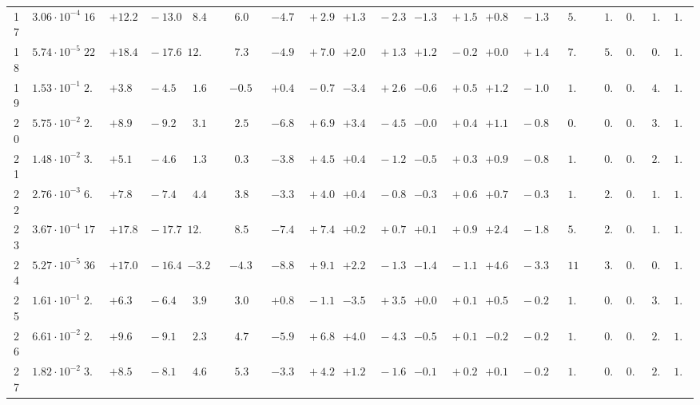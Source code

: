 \documentclass[12pt]{article}
\begin{document}
\begin{table}
\begin{tabular}{ccrr@{\hskip0pt}rrc@{\hskip0pt}r@{\hskip0pt}c@{\hskip0pt}r@{\hskip0pt}rr@{\hskip0pt}rr@{\hskip0pt}rr@{\hskip0pt}rr@{\hskip0pt}r@{\hskip0pt}r@{\hskip0pt}c|rr|r}
17 &$3.06 \cdot 10^{-4}$ &$16.0$  & ${+12.2~}$&${~-13.0}$ & $ 8.4$  & &$ 6.0$&&${-4.7~}$&${~+2.9}$ & ${+1.3~}$&${~-2.3}$ & ${-1.3~}$&${~+1.5}$ & ${+0.8~}$&${~-1.3}$ & &$ 5.3$&&$ 1.3$  & $0.96$  & $ 1.6$  & $1.05$   \\ 
18 &$5.74 \cdot 10^{-5}$ &$22.1$  & ${+18.4~}$&${~-17.6}$ & $12.1$  & &$ 7.3$&&${-4.9~}$&${~+7.0}$ & ${+2.0~}$&${~+1.3}$ & ${+1.2~}$&${~-0.2}$ & ${+0.0~}$&${~+1.4}$ & &$ 7.3$&&$ 5.1$  & $0.96$  & $ 0.6$  & $1.00$   \\ 
19 &$1.53 \cdot 10^{-1}$ &$ 2.2$  & ${+3.8~}$&${~-4.5}$ & $ 1.6$  & &$-0.5$&&${+0.4~}$&${~-0.7}$ & ${-3.4~}$&${~+2.6}$ & ${-0.6~}$&${~+0.5}$ & ${+1.2~}$&${~-1.0}$ & &$ 1.2$&&$ 0.2$  & $0.89$  & $ 4.0$  & $1.02$   \\ 
20 &$5.75 \cdot 10^{-2}$ &$ 2.2$  & ${+8.9~}$&${~-9.2}$ & $ 3.1$  & &$ 2.5$&&${-6.8~}$&${~+6.9}$ & ${+3.4~}$&${~-4.5}$ & ${-0.0~}$&${~+0.4}$ & ${+1.1~}$&${~-0.8}$ & &$ 0.9$&&$ 0.5$  & $0.92$  & $ 3.4$  & $1.02$   \\ 
21 &$1.48 \cdot 10^{-2}$ &$ 3.0$  & ${+5.1~}$&${~-4.6}$ & $ 1.3$  & &$ 0.3$&&${-3.8~}$&${~+4.5}$ & ${+0.4~}$&${~-1.2}$ & ${-0.5~}$&${~+0.3}$ & ${+0.9~}$&${~-0.8}$ & &$ 1.0$&&$ 0.5$  & $0.94$  & $ 2.7$  & $1.03$   \\ 
22 &$2.76 \cdot 10^{-3}$ &$ 6.1$  & ${+7.8~}$&${~-7.4}$ & $ 4.4$  & &$ 3.8$&&${-3.3~}$&${~+4.0}$ & ${+0.4~}$&${~-0.8}$ & ${-0.3~}$&${~+0.6}$ & ${+0.7~}$&${~-0.3}$ & &$ 1.7$&&$ 2.3$  & $0.95$  & $ 1.7$  & $1.03$   \\ 
23 &$3.67 \cdot 10^{-4}$ &$17.9$  & ${+17.8~}$&${~-17.7}$ & $12.3$  & &$ 8.5$&&${-7.4~}$&${~+7.4}$ & ${+0.2~}$&${~+0.7}$ & ${+0.1~}$&${~+0.9}$ & ${+2.4~}$&${~-1.8}$ & &$ 5.0$&&$ 2.5$  & $0.96$  & $ 1.5$  & $1.05$   \\ 
24 &$5.27 \cdot 10^{-5}$ &$36.3$  & ${+17.0~}$&${~-16.4}$ & $-3.2$  & &$-4.3$&&${-8.8~}$&${~+9.1}$ & ${+2.2~}$&${~-1.3}$ & ${-1.4~}$&${~-1.1}$ & ${+4.6~}$&${~-3.3}$ & &$11.7$&&$ 3.3$  & $0.94$  & $ 0.5$  & $1.06$   \\ 
25 &$1.61 \cdot 10^{-1}$ &$ 2.6$  & ${+6.3~}$&${~-6.4}$ & $ 3.9$  & &$ 3.0$&&${+0.8~}$&${~-1.1}$ & ${-3.5~}$&${~+3.5}$ & ${+0.0~}$&${~+0.1}$ & ${+0.5~}$&${~-0.2}$ & &$ 1.1$&&$ 0.3$  & $0.89$  & $ 3.3$  & $1.02$   \\ 
26 &$6.61 \cdot 10^{-2}$ &$ 2.4$  & ${+9.6~}$&${~-9.1}$ & $ 2.3$  & &$ 4.7$&&${-5.9~}$&${~+6.8}$ & ${+4.0~}$&${~-4.3}$ & ${-0.5~}$&${~+0.1}$ & ${-0.2~}$&${~-0.2}$ & &$ 1.0$&&$ 0.3$  & $0.93$  & $ 2.9$  & $1.03$   \\ 
27 &$1.82 \cdot 10^{-2}$ &$ 3.3$  & ${+8.5~}$&${~-8.1}$ & $ 4.6$  & &$ 5.3$&&${-3.3~}$&${~+4.2}$ & ${+1.2~}$&${~-1.6}$ & ${-0.1~}$&${~+0.2}$ & ${+0.1~}$&${~-0.2}$ & &$ 1.0$&&$ 0.7$  & $0.94$  & $ 2.8$  & $1.02$   \\ 

\end{tabular}
\end{table}
\end{document}
